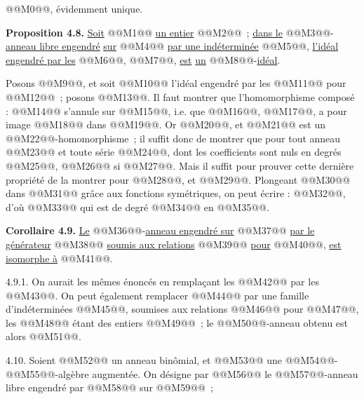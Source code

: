 
@@M0@@,
évidemment unique.

\textbf{Proposition 4.8.} \uline{Soit} @@M1@@ \uline{un entier} @@M2@@~; \uline{dans le} @@M3@@-\uline{anneau libre engendré} \uline{sur} @@M4@@ \uline{par une indéterminée} @@M5@@, \uline{l'idéal engendré par les} @@M6@@, @@M7@@, \uline{est} \uline{un} @@M8@@-\uline{idéal}.

Posons @@M9@@, et soit @@M10@@ l'idéal engendré par les @@M11@@ pour @@M12@@~; posons @@M13@@. Il faut montrer que l'homomorphisme composé : @@M14@@ s'annule sur @@M15@@, i.e. que @@M16@@, @@M17@@, a pour image @@M18@@ dans @@M19@@. Or @@M20@@, et @@M21@@ est un @@M22@@-homomorphisme~; il suffit donc de montrer que pour tout anneau @@M23@@ et toute série @@M24@@, dont les coefficients sont nuls en degrés @@M25@@, @@M26@@ si @@M27@@. Mais il suffit pour prouver cette dernière propriété de la montrer pour @@M28@@, et @@M29@@. Plongeant @@M30@@ dans @@M31@@ grâce aux fonctions symétriques, on peut écrire : @@M32@@, d'où
@@M33@@
qui est de degré @@M34@@ en @@M35@@.

\textbf{Corollaire 4.9.} \uline{Le} @@M36@@-\uline{anneau engendré sur} @@M37@@ \uline{par le générateur} @@M38@@ \uline{soumis aux relations} @@M39@@ \uline{pour} @@M40@@, \uline{est isomorphe à} @@M41@@.

4.9.1. On aurait les mêmes énoncés en remplaçant les @@M42@@ par les @@M43@@. On peut également remplacer @@M44@@ par une famille d'indéterminées @@M45@@, soumises aux relations @@M46@@ pour @@M47@@, les @@M48@@ étant des entiers @@M49@@~; le @@M50@@-anneau obtenu est alors @@M51@@.

4.10. Soient @@M52@@ un anneau binômial, et @@M53@@ une @@M54@@-@@M55@@-algèbre augmentée. On désigne par @@M56@@ le @@M57@@-anneau libre engendré par @@M58@@ sur @@M59@@~; 
